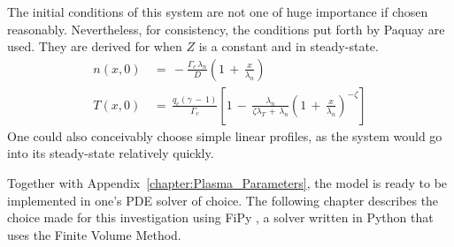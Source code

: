 The initial conditions of this system are not one of huge importance if chosen reasonably.
Nevertheless, for consistency, the conditions put forth by Paquay \cite{paquay_studying_2012} are used.
They are derived for when $Z$ is a constant and in steady-state.
\begin{align} %
	n(x,0) \,&=\, -\frac{\Gamma_c \, \lambda_n}{D} \left(1 \,+\,
		\frac{x}{\lambda_n}\right) \label{eq:n_initial} \\
	T(x,0) \,&=\, \frac{q_c (\gamma \,-\, 1)}{\Gamma_c} \left[1 \,-\,
		\frac{\lambda_n}{\zeta\lambda_T \,+\, \lambda_n} \left(1 \,+\,
		\frac{x}{\lambda_n}\right)^{-\zeta}\right]\label{eq:T_initial}
\end{align}
One could also conceivably choose simple linear profiles, as the system would go into its steady-state relatively quickly.

Together with Appendix~\ref{chapter:Plasma_Parameters}, the model is ready to be implemented in one's PDE solver of choice.
The following chapter describes the choice made for this investigation using FiPy \cite{guyer_fipy:_2009}, a solver written in Python  that uses the Finite Volume Method.

